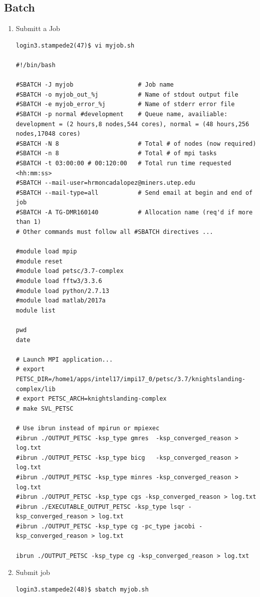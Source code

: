 \documentclass{article}
\begin{document}
\subsection{Batch}
\begin{enumerate}
\item  Submitt a Job
\scriptsize
\begin{verbatim}
login3.stampede2(47)$ vi myjob.sh

#!/bin/bash

#SBATCH -J myjob                  # Job name
#SBATCH -o myjob_out_%j           # Name of stdout output file
#SBATCH -e myjob_error_%j         # Name of stderr error file
#SBATCH -p normal #development    # Queue name, availiable: development = (2 hours,8 nodes,544 cores), normal = (48 hours,256 nodes,17048 cores)
#SBATCH -N 8                      # Total # of nodes (now required)
#SBATCH -n 8                      # Total # of mpi tasks
#SBATCH -t 03:00:00 # 00:120:00   # Total run time requested <hh:mm:ss>
#SBATCH --mail-user=hrmoncadalopez@miners.utep.edu
#SBATCH --mail-type=all           # Send email at begin and end of job
#SBATCH -A TG-DMR160140           # Allocation name (req'd if more than 1)
# Other commands must follow all #SBATCH directives ...

#module load mpip
#module reset
#module load petsc/3.7-complex
#module load fftw3/3.3.6
#module load python/2.7.13
#module load matlab/2017a 
module list

pwd
date

# Launch MPI application...
# export PETSC_DIR=/home1/apps/intel17/impi17_0/petsc/3.7/knightslanding-complex/lib
# export PETSC_ARCH=knightslanding-complex
# make SVL_PETSC

# Use ibrun instead of mpirun or mpiexec
#ibrun ./OUTPUT_PETSC -ksp_type gmres  -ksp_converged_reason > log.txt
#ibrun ./OUTPUT_PETSC -ksp_type bicg   -ksp_converged_reason > log.txt
#ibrun ./OUTPUT_PETSC -ksp_type minres -ksp_converged_reason > log.txt
#ibrun ./OUTPUT_PETSC -ksp_type cgs -ksp_converged_reason > log.txt
#ibrun ./EXECUTABLE_OUTPUT_PETSC -ksp_type lsqr -ksp_converged_reason > log.txt
#ibrun ./OUTPUT_PETSC -ksp_type cg -pc_type jacobi -ksp_converged_reason > log.txt

ibrun ./OUTPUT_PETSC -ksp_type cg -ksp_converged_reason > log.txt
\end{verbatim}
\normalsize
\item Submit job
\scriptsize
\begin{verbatim}
login3.stampede2(48)$ sbatch myjob.sh


\end{verbatim}
\end{enumerate}
\end{document}
